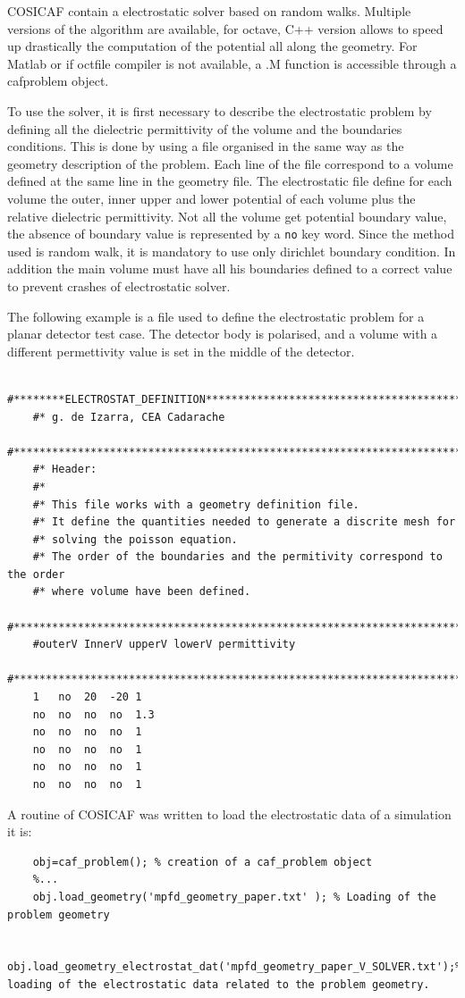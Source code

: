 \documentclass[10pt]{article}
\begin{document}
	 COSICAF contain a electrostatic solver based on random walks. Multiple versions of the algorithm are available, for octave, C++ version allows to speed up drastically the computation of the potential all along the geometry. For Matlab or if octfile compiler is not available, a .M function is accessible through a cafproblem object.
	 
	 To use the solver, it is first necessary to describe the electrostatic problem by defining all the dielectric permittivity of the volume and the boundaries conditions. This is done by using a file organised in the same way as the geometry description of the problem. Each line of the file correspond to a volume defined at the same line in the geometry file. The electrostatic file define for each volume the outer, inner upper and lower potential of each volume plus the relative dielectric permittivity. Not all the volume get potential boundary value, the absence of boundary value is represented by a \lstinline{no} key word. Since the method used is random walk, it is mandatory to use only dirichlet boundary condition. In addition the main volume must have all his boundaries defined to a correct value to prevent crashes of electrostatic solver. 
	 
	 The following example is a file used to define the electrostatic problem for a planar detector test case. The detector body is polarised, and a volume with a different permettivity value is set in the middle of the detector.
	 
	\begin{lstlisting}
	#********ELECTROSTAT_DEFINITION*********************************************
	#* g. de Izarra, CEA Cadarache 
	#***************************************************************************
	#* Header: 
	#* 
	#* This file works with a geometry definition file. 
	#* It define the quantities needed to generate a discrite mesh for
	#* solving the poisson equation.
	#* The order of the boundaries and the permitivity correspond to the order 
	#* where volume have been defined.
	#***************************************************************************
	#outerV InnerV upperV lowerV permittivity
	#***************************************************************************
	1	no	20	-20	1
	no  no  no  no  1.3
	no  no  no  no  1
	no  no  no  no  1
	no	no	no	no	1
	no	no	no	no	1
	\end{lstlisting}

	A routine of COSICAF was written to load the electrostatic data of a simulation it is: 
	\begin{lstlisting}
	obj=caf_problem(); % creation of a caf_problem object
	%...
	obj.load_geometry('mpfd_geometry_paper.txt' ); % Loading of the problem geometry
	
	obj.load_geometry_electrostat_dat('mpfd_geometry_paper_V_SOLVER.txt');% loading of the electrostatic data related to the problem geometry.
	\end{lstlisting}
\end{document}
